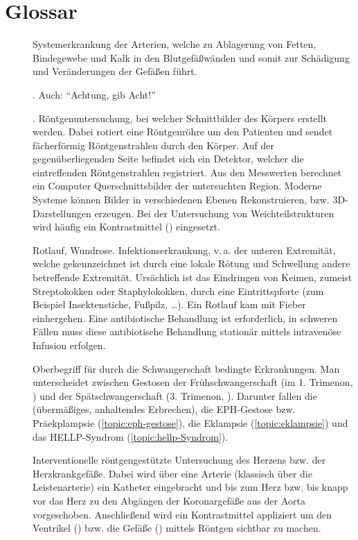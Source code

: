 
\chapter{Glossar}

\begin{description}
  \item[] Systemerkrankung der
  Arterien, welche zu Ablagerung von Fetten, Bindegewebe und Kalk in
  den Blutgefäßwänden und somit zur Schädigung und
  Veränderungen der Gefäßen führt.
  \item[]
  \item[]    . Auch: \enquote{Achtung, gib Acht!}
  \item[]  .
  Röntgenuntersuchung, bei welcher Schnittbilder des
  Körpers erstellt werden. Dabei rotiert  eine
  Röntgenröhre um den Patienten und sendet
  fächerförmig Röntgenstrahlen durch den Körper. Auf der
  gegenüberliegenden Seite  befindet sich ein Detektor,
  welcher die eintreffenden Röntgenstrahlen registriert. Aus
  den Messwerten berechnet ein Computer
  Querschnittsbilder der untersuchten Region. Moderne
  Systeme können Bilder in verschiedenen Ebenen
  Rekonstruieren, bzw. 3D-Darstellungen erzeugen. Bei der
  Untersuchung von Weichteilstrukturen wird häufig ein
  Kontrastmittel ()
  eingesetzt.
  \item[]  Rotlauf, Wundrose. \label{topic:erysipel}
  Infektionserkrankung, v.\,a. der unteren Extremität, welche
  gekennzeichnet ist durch eine lokale Rötung und Schwellung 
  andere betreffende Extremität. Ursächlich ist das
  Eindringen von Keimen, zumeist Streptokokken oder
  Staphylokokken, durch eine Eintrittspforte (zum Beispiel
  Insektenstiche, Fußpilz, \ldots). Ein Rotlauf kam mit 
  Fieber einhergehen. Eine antibiotische Behandlung ist
   erforderlich, in schweren Fällen muss diese
  antibiotische Behandlung stationär mittels intravenöse
  Infusion erfolgen.
  \item[] Oberbegriff für durch die
  Schwangerschaft bedingte Erkrankungen. Man unterscheidet
  zwischen Gestosen der Frühschwangerschaft (im
  1. Trimenon, ) und der Spätschwangerschaft
  (3. Trimenon, ). Darunter fallen die
   (übermäßiges, anhaltendes
  Erbrechen), die EPH-Gestose bzw. Präekplampsie
  (\ref{topic:eph-gestose}), die Eklampsie
  (\ref{topic:eklampsie}) und das HELLP-Syndrom
  (\ref{topic:hellp-Syndrom}).
  \item[]
  \label{topic:Herzkatheteruntersuchung} Interventionelle
  röntgengestützte Untersuchung des Herzens bzw. der
  Herzkrankgefäße. Dabei wird über eine Arterie
  (klassisch über die Leistenarterie) ein Katheter
  eingebracht und bis zum Herz bzw. bis knapp vor das Herz
  zu den Abgängen der Koronargefäße aus der Aorta vorgeschoben.
  Anschließend wird ein Kontrastmittel appliziert um den
  Ventrikel () bzw. die Gefäße
  () mittels Röntgen sichtbar zu
  machen.
  

\end{description}
